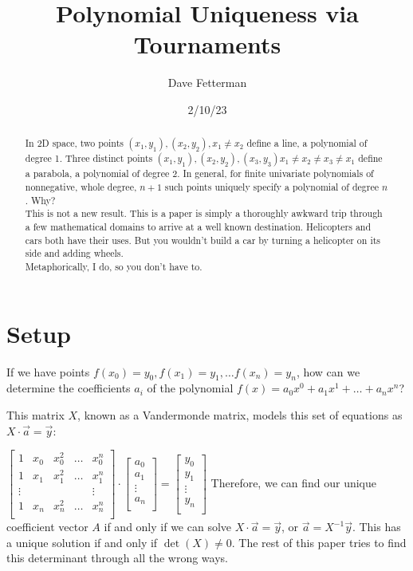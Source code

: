 \documentclass[11pt, oneside]{article} 	%
\title{Polynomial Uniqueness via Tournaments}
\author{Dave Fetterman}
\affil{Obviously Unemployed}
\date{2/10/23}
\begin{document}
\maketitle

\begin{abstract}

In 2D space, two points $(x_1, y_1), (x_2, y_2), x_1 \neq x_2$ define a line, a polynomial of degree 1.  Three distinct points $(x_1, y_1), (x_2, y_2), (x_3, y_3) x_1 \neq x_2 \neq x_3 \neq x_1$ define a parabola, a polynomial of degree 2.  In general, for finite univariate polynomials of nonnegative, whole degree, $n+1$ such points uniquely specify a polynomial of degree $n$.  Why?
\\

This is not a new result. This is a paper is simply a thoroughly awkward trip through a few mathematical domains to arrive at a well known destination. Helicopters and cars both have their uses. But you wouldn't build a car by turning a helicopter on its side and adding wheels.  
\\

Metaphorically, I do, so you don't have to.

\end{abstract}

\section{Setup}

If we have points $f(x_0) = y_0, f(x_1) = y_1,  \ldots f(x_{n}) = y_{n}$, how can we determine the coefficients $a_i$ of the polynomial $f(x) = a_0x^0 + a_1x^1 + \ldots + a_nx^n$?

This matrix $X$, known as a Vandermonde matrix\cite{1}, models this set of equations as $X \cdot \vec{a} = \vec{y}$:

 $\begin{bmatrix}
1 & x_0 & x_0^2 & \ldots & x_0^{n} \\
1 & x_1 & x_1^2 & \ldots & x_1^{n} \\
\vdots & & & & \vdots  \\
1 & x_{n} & x_{n}^2 & \ldots & x_{n}^{n} \\
\end{bmatrix}
\cdot 
\begin{bmatrix}
a_0 \\
a_1 \\
\vdots \\
a_n \\
\end{bmatrix}
=
\begin{bmatrix}
y_0 \\
y_1 \\
\vdots \\
y_{n} \\
\end{bmatrix}
$
Therefore, we can find our unique coefficient vector $A$ if and only if we can solve $X \cdot \vec{a} = \vec{y}$, or $\vec{a} = X^{-1} \vec{y}$.  This has a unique solution if and only if $\det(X) \neq 0$.  The rest of this paper tries to find this determinant through all the wrong ways.
\end{document}

